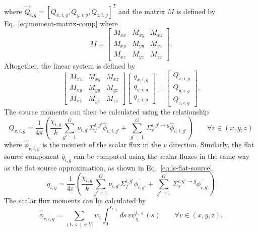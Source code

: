 where $\vec{Q}_{i,g} = \left[Q_{x,i,g}, Q_{y,i,g}, Q_{z,i,g}\right]^T$ and the matrix $M$ is defined by Eq.~\ref{eq:moment-matrix-comp} where
\begin{equation}
M = 
\begin{bmatrix}
M_{xx} & M_{xy}  & M_{xz} \\
M_{xy} & M_{yy}  & M_{yz} \\
M_{xz} & M_{yz}  & M_{zz}
\end{bmatrix}.
\end{equation}
Altogether, the linear system is defined by
\begin{equation}
\begin{bmatrix}
M_{xx} & M_{xy}  & M_{xz} \\
M_{xy} & M_{yy}  & M_{yz} \\
M_{xz} & M_{yz}  & M_{zz}
\end{bmatrix}
\begin{bmatrix}
q_{x,i,g} \\
q_{y,i,g} \\
q_{z,i,g}
\end{bmatrix}
=
\begin{bmatrix}
Q_{x,i,g} \\
Q_{y,i,g} \\
Q_{z,i,g}
\end{bmatrix}
.
\label{eq:moments-linear-sys}
\end{equation}
The source moments can then be calculated using the relationship
\begin{equation}
Q_{v,i,g} = \frac{1}{4 \pi} \left( \frac{\chi_{i,g}}{k} \sum_{g'=1}^{G} \nu_{i,g'} \Sigma_f^{i,g'} \hat{\phi}_{v,i,g'} + \, \sum_{g'=1}^G \,  \Sigma_{s}^{i,g' \rightarrow g} \hat{\phi}_{v,i,g'} \right) \qquad \forall v \in (x,y,z)
\end{equation}
where $\hat{\phi}_{v,i,g}$ is the moment of the scalar flux in the $v$ direction. Similarly, the flat source component $\overline{q}_{i,g}$ can be computed using the scalar fluxes in the same way as the flat source approximation, as shown in Eq.~\ref{eq:ls-flat-source}.
\begin{equation}
\overline{q}_{i,g} = \frac{1}{4 \pi} \left( \frac{\chi_{i,g}}{k} \sum_{g'=1}^{G} \nu_{i,g'} \Sigma_f^{i,g'} \overline{\phi_{i,g'}} + \, \sum_{g'=1}^G \,  \Sigma_{s}^{i,g' \rightarrow g} \overline{\phi_{i,g'}} \right)
\label{eq:ls-flat-source}
\end{equation}
The scalar flux moments can be calculated by
\begin{equation}
\hat{\phi}_{v,i,g} = \sum_{(t,\varsigma) \in V_i} w_t \int_{0}^{\ell_{t,\varsigma}} ds \, v \psi^{t,\varsigma}_g(s) \qquad \forall v \in (x,y,z).
\end{equation}
